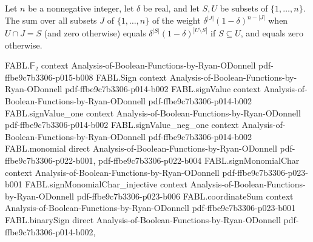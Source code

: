 \begin{theorem}
\label{FABL.sum_deltaRandomSubsetWeight_inter_eq}
\leanok
{}
Let $n$ be a nonnegative integer, let $\delta$ be real, and let $S,U$ be subsets of
$\{1,\ldots,n\}$. The sum over all subsets $J$ of $\{1,\ldots,n\}$ of the weight
$\delta^{|J|}(1-\delta)^{n-|J|}$ when $U\cap J=S$ (and zero otherwise) equals
$\delta^{|S|}(1-\delta)^{|U\setminus S|}$ if $S\subseteq U$, and equals zero
otherwise.
\end{theorem}

\begin{theorem}
\label{FABL.sum_sq_fourier_of_inter_eq}
\leanok
{}
\proofstep
  {FABL.𝔽₂}
  {context}
  {Analysis-of-Boolean-Functions-by-Ryan-ODonnell}
  {pdf-ffbe9c7b3306-p015-b008}
\proofstep
  {FABL.Sign}
  {context}
  {Analysis-of-Boolean-Functions-by-Ryan-ODonnell}
  {pdf-ffbe9c7b3306-p014-b002}
\proofstep
  {FABL.signValue}
  {context}
  {Analysis-of-Boolean-Functions-by-Ryan-ODonnell}
  {pdf-ffbe9c7b3306-p014-b002}
\proofstep
  {FABL.signValue_one}
  {context}
  {Analysis-of-Boolean-Functions-by-Ryan-ODonnell}
  {pdf-ffbe9c7b3306-p014-b002}
\proofstep
  {FABL.signValue_neg_one}
  {context}
  {Analysis-of-Boolean-Functions-by-Ryan-ODonnell}
  {pdf-ffbe9c7b3306-p014-b002}
\proofstep
  {FABL.monomial}
  {direct}
  {Analysis-of-Boolean-Functions-by-Ryan-ODonnell}
  {pdf-ffbe9c7b3306-p022-b001,
    pdf-ffbe9c7b3306-p022-b004}
\proofstep
  {FABL.signMonomialChar}
  {context}
  {Analysis-of-Boolean-Functions-by-Ryan-ODonnell}
  {pdf-ffbe9c7b3306-p023-b001}
\proofstep
  {FABL.signMonomialChar_injective}
  {context}
  {Analysis-of-Boolean-Functions-by-Ryan-ODonnell}
  {pdf-ffbe9c7b3306-p023-b006}
\proofstep
  {FABL.coordinateSum}
  {context}
  {Analysis-of-Boolean-Functions-by-Ryan-ODonnell}
  {pdf-ffbe9c7b3306-p023-b001}
\proofstep
  {FABL.binarySign}
  {direct}
  {Analysis-of-Boolean-Functions-by-Ryan-ODonnell}
  {pdf-ffbe9c7b3306-p014-b002,
}
\end{theorem}
